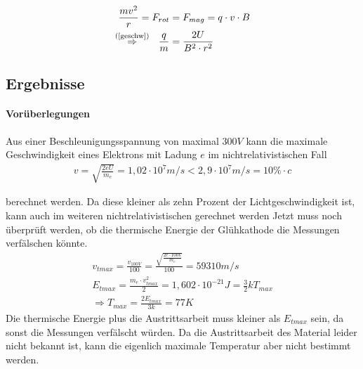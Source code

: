 \documentclass[11pt, a4paper]{article}
\begin{document}
    \begin{align}
        \frac{mv^2}{r} = F_{rot} &= F_{mag} = q \cdot v \cdot B \\
        \overset{\text{(\ref{geschw})}}{\Rightarrow} \ \  \frac{q}{m} &= \frac{2U}{B^2 \cdot r^2} \label{qm_formel}
    \end{align}

    \subsection{Ergebnisse}
    \paragraph{Vorüberlegungen}

    Aus einer Beschleunigungsspannung von maximal $300 \si{V}$ kann die maximale Geschwindigkeit eines Elektrons mit Ladung $e$ im nichtrelativistischen Fall
    \begin{align}
        v = \sqrt{\frac{2 e U}{m_e}} = 1,02 \cdot 10^{7} \si{m/s} < 2,9 \cdot 10^{7} \si{m/s} = 10\% \cdot c
    \end{align}


    berechnet werden. Da diese kleiner als zehn Prozent der Lichtgeschwindigkeit ist, kann auch im weiteren nichtrelativistischen gerechnet werden
    Jetzt muss noch überprüft werden, ob die thermische Energie der Glühkathode die Messungen verfälschen könnte.
    \begin{align}
        v_{tmax} = \frac{v_{100V}}{100} = \frac{\sqrt{\frac{2 e \cdot 100 \si{V}}{m_e}}}{100} = 59310 \si{m \per s} \\
        E_{tmax} = \frac{m_e \cdot v_{tmax}^2}{2} = 1,602 \cdot 10^{-21} \si{J} = \frac{3}{2} k T_{max} \\
        \Rightarrow T_{max} = \frac{2 E_{tmax}}{3 k} = 77K
    \end{align}
    Die thermische Energie plus die Austrittsarbeit muss kleiner als $E_{tmax}$ sein, da sonst die Messungen verfälscht würden. Da die Austrittsarbeit des Material leider nicht bekannt ist, kann die eigenlich maximale Temperatur aber nicht bestimmt werden.
\end{document}
